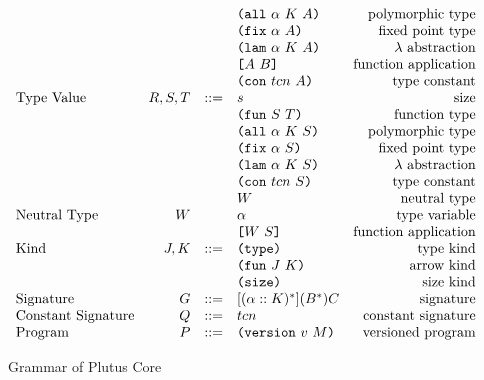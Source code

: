 \documentclass[../main.tex]{subfiles}
\begin{document}
\begin{figure*}[t]
\[\begin{array}{lrclr}
                                  &        &     & \texttt{(} \texttt{all} ~ \alpha ~ K ~ A \texttt{)}        & \textrm{polymorphic type}\\
                                  &        &     & \texttt{(} \texttt{fix} ~ \alpha ~ A \texttt{)}           & \textrm{fixed point type}\\
                                  &        &     & \texttt{(} \texttt{lam} ~ \alpha ~ K ~ A \texttt{)}        & \textrm{$\lambda$ abstraction}\\
                                  &        &     & \texttt{[} A ~ B \texttt{]}                & \textrm{function application}\\
                                  &        &     & \texttt{(} \texttt{con} ~ tcn ~ A \texttt{)}          & \textrm{type constant}\\
        \textrm{Type Value}       & R,S,T  & ::= & s                          & \textrm{size}\\
                                  &        &     & \texttt{(} \texttt{fun} ~ S ~ T \texttt{)}                & \textrm{function type}\\
                                  &        &     & \texttt{(} \texttt{all} ~ \alpha ~ K ~ S \texttt{)}        & \textrm{polymorphic type}\\
                                  &        &     & \texttt{(} \texttt{fix} ~ \alpha ~ S \texttt{)}           & \textrm{fixed point type}\\
                                  &        &     & \texttt{(} \texttt{lam} ~ \alpha ~ K ~ S \texttt{)}        & \textrm{$\lambda$ abstraction}\\
                                  &        &     & \texttt{(} \texttt{con} ~ tcn ~ S \texttt{)}          & \textrm{type constant}\\
                                  &        &     & W                          & \textrm{neutral type}\\
        \textrm{Neutral Type}     & W      &     & \alpha                     & \textrm{type variable}\\
                                  &        &     & \texttt{[} W ~ S \texttt{]}                & \textrm{function application}\\
        \textrm{Kind}             & J,K    & ::= & \texttt{(} \texttt{type} \texttt{)}{}                   & \textrm{type kind}\\
                                  &        &     & \texttt{(} \texttt{fun} ~ J ~ K \texttt{)}                & \textrm{arrow kind}\\
                                  &        &     & \texttt{(} \texttt{size} \texttt{)}{}                   & \textrm{size kind}\\
        \textrm{Signature}        & G      & ::= & [(\alpha :: K)^*](B^*)C     & \textrm{signature}\\
        \textrm{Constant Signature}   & Q      & ::= & tcn                        & \textrm{constant signature}\\
        \textrm{Program}          & P      & ::= & \texttt{(} \texttt{version} ~ v ~ M \texttt{)}             & \textrm{versioned program}\\

    \end{array}\]
    \caption{Grammar of Plutus Core}
    \label{fig:Plutus_core_grammar}
\end{figure*}
\end{document}
